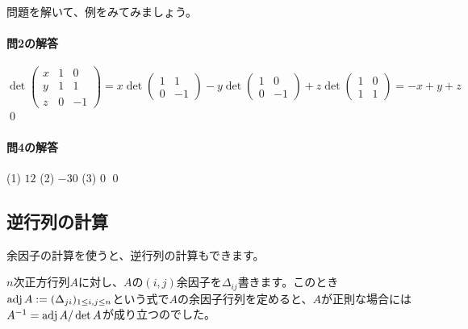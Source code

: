 問題を解いて、例をみてみましょう。

\paragraph{問2の解答}
\[
\det
\begin{pmatrix}
x & 1 & 0 \\
y & 1 & 1 \\
z & 0 & -1
\end{pmatrix}
=
x \det
\begin{pmatrix}
1 & 1 \\
0 & -1
\end{pmatrix}
- y \det
\begin{pmatrix}
1 & 0 \\
0 & -1
\end{pmatrix}
+ z \det
\begin{pmatrix}
1 & 0 \\
1 & 1
\end{pmatrix}
= -x + y + z
\]
\qed

\paragraph{問4の解答} (1) $12$ (2) $-30$ (3) $0$ \qed

\subsection{逆行列の計算}

余因子の計算を使うと、逆行列の計算もできます。

$n$次正方行列$A$に対し、$A$の$(i, j)$余因子を$\Delta_{ij}$書きます。このとき$\operatorname{adj} A := (\Delta_{ji})_{1 \leq i, j\leq n}$という式で$A$の余因子行列を定めると、$A$が正則な場合には$A^{-1} = \operatorname{adj} A / \det A$が成り立つのでした。

